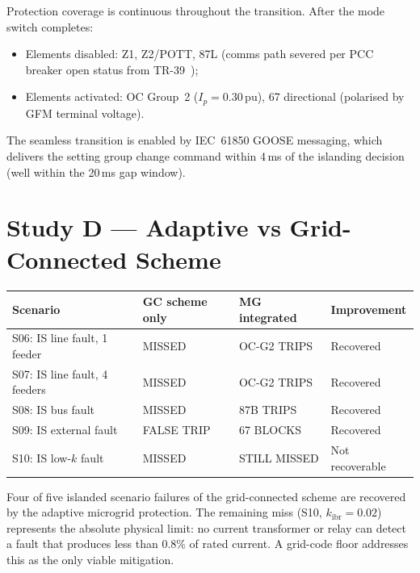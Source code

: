 \documentclass[11pt,a4paper]{article}
\begin{document}
\medskip\noindent
Protection coverage is continuous throughout the transition.  After the mode
switch completes:
\begin{itemize}
  \item Elements disabled: Z1, Z2/POTT, 87L (comms path severed per PCC breaker
    open status from TR-39~\cite{SAMBP_TR39});
  \item Elements activated: OC Group~2 ($I_p=0.30$\,pu), 67 directional
    (polarised by GFM terminal voltage).
\end{itemize}

The seamless transition is enabled by IEC~61850 GOOSE messaging, which delivers
the setting group change command within 4\,ms of the islanding decision
(well within the 20\,ms gap window).

\section{Study D --- Adaptive vs Grid-Connected Scheme}
\label{sec:studyD}

\begin{center}
\begin{tabular}{@{}llll@{}}
\toprule
Scenario & GC scheme only & MG integrated & Improvement \\
\midrule
S06: IS line fault, 1 feeder & MISSED & OC-G2 TRIPS & Recovered \\
S07: IS line fault, 4 feeders & MISSED & OC-G2 TRIPS & Recovered \\
S08: IS bus fault & MISSED & 87B TRIPS & Recovered \\
S09: IS external fault & FALSE TRIP & 67 BLOCKS & Recovered \\
S10: IS low-$k$ fault & MISSED & STILL MISSED & Not recoverable \\
\bottomrule
\end{tabular}
\end{center}

\medskip\noindent
Four of five islanded scenario failures of the grid-connected scheme are
recovered by the adaptive microgrid protection.  The remaining miss (S10,
$k_\mathrm{ibr}=0.02$) represents the absolute physical limit: no current
transformer or relay can detect a fault that produces less than 0.8\% of rated
current.  A grid-code floor addresses this as the only viable mitigation.

\end{document}
